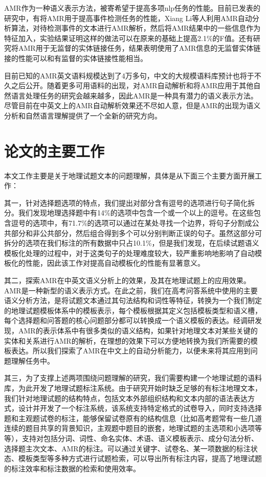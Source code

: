 \documentclass[master, winfont]{njuthesis}
\begin{document}
AMR作为一种语义表示方法，被寄希望于提高多项nlp任务的性能。目前已发表的研究中，有将AMR用于提高事件检测任务的性能\cite{kai2015improving}，Xiang Li等人利用AMR自动分析算法，对待检测事件的文本进行AMR解析，然后将AMR结果中的一些信息作为特征加入，实验结果证明这样的做法可以在原来的基础上提高2.1\%的F值。还有研究将AMR用于无监督的实体链接任务\cite{Pan2015}，结果表明使用了AMR信息的无监督实体链接的性能可以和有监督的实体链接性能相当。

目前已知的AMR英文语料规模达到了4万多句，中文的大规模语料库预计也将于不久之后公开。随着更多可用语料的出现，对AMR自动解析和将AMR应用于其他自然语言处理任务的研究会越来越多，因此AMR是一种具有潜力的语义表示方法。尽管目前在中英文上的AMR自动解析效果还不尽如人意，但是AMR的出现为语义分析和自然语言理解提供了一个全新的研究方向。

\section{论文的主要工作}
本文工作主要是关于地理试题文本的问题理解，具体是从下面三个主要方面开展工作：

其一，针对选择题选项的特点，我们提出对部分含有逗号的选项进行句子简化拆分。我们发现地理选择题中有14\%的选项中包含一个或一个以上的逗号。在这些包含逗号的选项中，有71.7\%的选项可以通过在某处寻找一个边界，将句子分割成公共部分和非公共部分，然后组合得到多个可以分别判断正误的句子。虽然这部分可拆分的选项在我们标注的所有数据中只占10.1\%，但是我们发现，在后续试题语义模板化处理的过程中，对于这类句子的处理难度较大，较严重影响地影响了自动模板化的性能，因此该工作对提高自动模板化的性能有显著意义。

其二，探索AMR在中英文语义分析上的效果，及其在地理试题上的应用效果。AMR是一种新型的语义表示方式。在此之前，我们在高考问答系统中使用的主要语义分析方法，是将试题文本通过其句法结构和词性等特征，转换为一个我们制定的地理试题模板体系中的模板表示，每个模板根据其定义包括模板类型和语义槽，每个选择题和问答题的核心问题部分都可以转换成一个语义模板的表达。经调研发现，AMR的表示体系中有很多类似的语义结构，如果针对地理文本对某些关键的实体和关系进行AMR的解析，在理想的效果下可以方便地转换为我们所需要的模板表达。所以我们探索了AMR在中文上的自动分析能力，以便未来将其应用到问题理解任务中。

其三，为了支撑上述两项围绕问题理解的研究，我们需要构建一个地理试题的语料库，为此开发了地理试题标注系统。由于研究开始时缺乏足够的有标注地理文本，我们针对地理试题的结构特点，包括文本外部组织结构和文本内部的语法表达方式，设计并开发了一个标注系统，该系统支持特定格式的试卷导入，同时支持选择题和主观题试卷的标注，能够保留试卷原有的结构信息（比如高考题常有一些几道连续的题目共享的背景知识，主观题中题目的嵌套，地理试题的主选项和小选项等等），支持对包括分词、词性、命名实体、术语、语义模板表示、成分句法分析、选择题主次文本、AMR的标注。可以通过关键字、试卷名、某一项数据的标注状态、模板类型等多种方式进行试题检索，可以导出所有标注内容，提高了地理试题的标注效率和标注数据的检索和使用效率。
\end{document}
